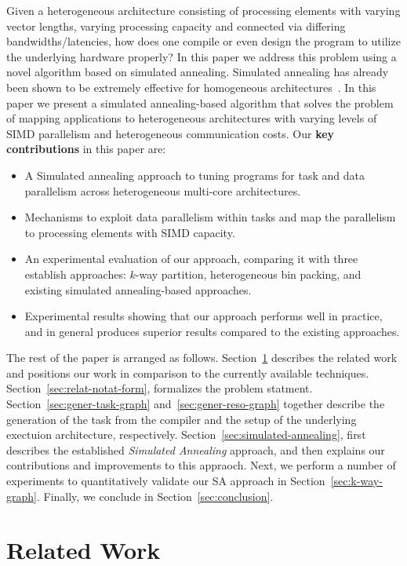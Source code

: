 \documentclass[10pt, conference, compsocconf]{IEEEtran}
\begin{document}
Given a heterogeneous architecture consisting of processing elements
with varying vector lengths, varying processing capacity and connected
via differing bandwidths/latencies, how does one compile or even
design the program to utilize the underlying hardware properly? In
this paper we address this problem using a novel algorithm based on
simulated annealing. Simulated annealing has already been shown to be
extremely effective for homogeneous architectures~\cite{hors06}. In
this paper we present a simulated annealing-based algorithm that
solves the problem of mapping applications to heterogeneous
architectures with varying levels of SIMD parallelism and
heterogeneous communication costs. Our \textbf{key contributions} in
this paper are:

\begin{itemize}
\item A Simulated annealing approach to tuning programs for task and
  data parallelism across heterogeneous multi-core architectures.
\item Mechanisms to exploit data parallelism within tasks and map
  the parallelism to processing elements with SIMD capacity.
\item An experimental evaluation of our approach, comparing it with
  three establish approaches: $k$-way partition, heterogeneous bin
  packing, and existing simulated annealing-based approaches.
\item Experimental results showing that our approach performs well in
  practice, and in general produces superior results compared to the
  existing approaches.
\end{itemize}
The rest of the paper is arranged as
follows. Section~\ref{sec:related-work} describes the related work and
positions our work in comparison to the currently available
techniques. Section~\ref{sec:relat-notat-form}, formalizes the problem
statment. Section~\ref{sec:gener-task-graph}
and~\ref{sec:gener-reso-graph} together describe the generation of the
task from the compiler and the setup of the underlying exectuion
architecture, respectively. Section~\ref{sec:simulated-annealing}, first
describes the established \textit{Simulated Annealing} approach, and
then explains our contributions and improvements to this appraoch. Next,
we perform a number of experiments to quantitatively validate our SA
approach in Section~\ref{sec:k-way-graph}. Finally, we conclude in
Section~\ref{sec:conclusion}.

\section{Related Work}
\label{sec:related-work}
\end{document}
